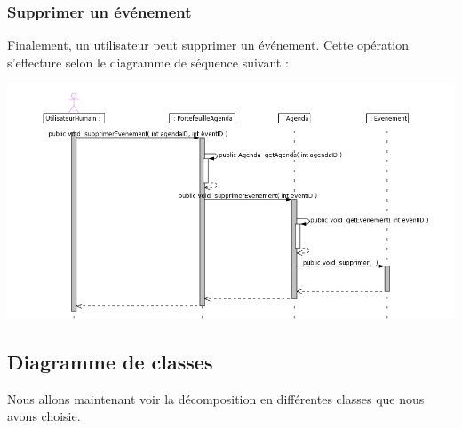 \documentclass[12pt , a4paper]{article}
\begin{document}
\begin{landscape}
\subsubsection{Supprimer un événement}
\noindent Finalement, un utilisateur peut supprimer un événement. Cette opération s'effecture selon le diagramme de séquence suivant :
\begin{center}
  \includegraphics[scale=0.55]{./images/diag_seq_supprimer_evt.jpg}
\end{center}
\end{landscape}

\subsection{Diagramme de classes}
\noindent Nous allons maintenant voir la décomposition en différentes classes que nous avons choisie.
\end{document}
